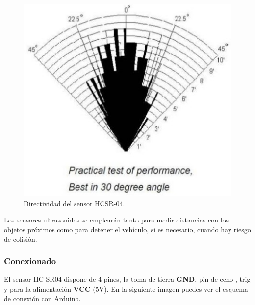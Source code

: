 \begin{figure}[H]
  \begin{center}
    \includegraphics[scale=0.3]{imagenes/ultrasonido_directividad.jpg}
  \end{center}
  \caption{Directividad del sensor HCSR-04.}
  \label{figura:rpi-modulo-bateria}
\end{figure}

Los sensores ultrasonidos se emplearán tanto para medir distancias con los objetos próximos
como para detener el vehículo, si es necesario, cuando hay riesgo de colisión.\\

\subsubsection{Conexionado}

El sensor HC-SR04 dispone de 4 pines, la toma de tierra \textbf{GND}, pin de echo , trig  y para la alimentación \textbf{VCC} 
(5V). En la siguiente imagen puedes ver el esquema de conexión con Arduino.

